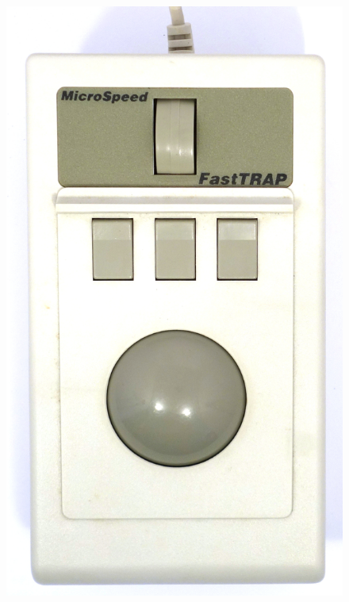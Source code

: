\documentclass[11pt, a4paper]{article}
\begin{document}
\begin{figure}[h]
    \centering
    \includegraphics[scale=0.3]{1987_microspeed_fasttrap/top_60.jpg}

\end{figure}
\end{document}
